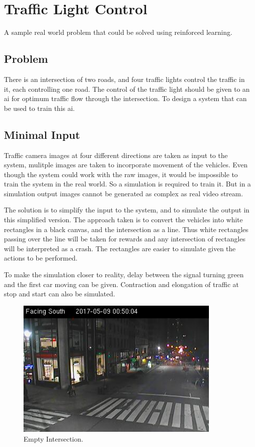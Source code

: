 \documentclass[a4paper,12pt]{report}
\begin{document}
		\section{Traffic Light Control}
				A sample real world problem that could be solved using reinforced learning.
			\subsection{Problem}
				There is an intersection of two roads, and four traffic lights control the traffic in it, each controlling one road. The control of the traffic light should be given to an \ac{ai} for optimum traffic flow through the intersection. To design a system that can be used to train this \ac{ai}. 

			\subsection{Minimal Input}
				Traffic camera images at four different directions are taken as input to the system, mulitple images are taken to incorporate movement of the vehicles. Even though the system could work with the raw images, it would be impossible to train the system in the real world. So a simulation is required to train it. But in a simulation output images cannot be generated as complex as real video stream. 

				The solution is to simplify the input to the system, and to simulate the output in this simplified version. The approach taken is to convert the vehicles into white rectangles in a black canvas, and the intersection as a line. Thus white rectangles passing over the line will be taken for rewards and any intersection of rectangles will be interpreted as a crash. The rectangles are easier to simulate given the actions to be performed.

				To make the simulation closer to reality, delay between the signal turning green and the first car moving can be given. Contraction and elongation of traffic at stop and start can also be simulated.

				\begin{figure}[H]
					\begin{centering}
						\includegraphics[width=10cm]{images/traffic1.png}
						\caption{Empty Intersection.}
					\end{centering}
				\end{figure}
\end{document}
